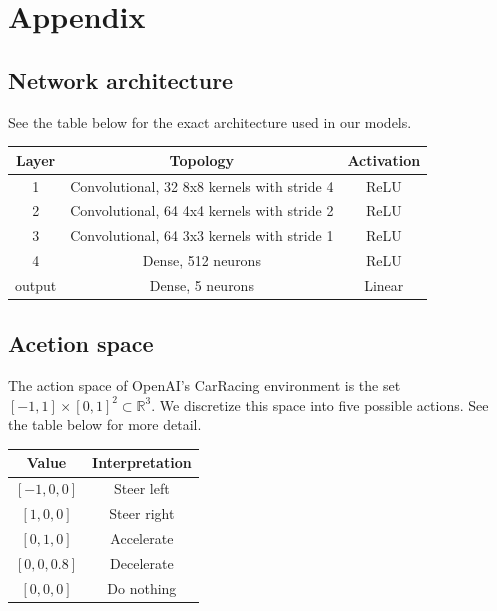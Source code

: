 \documentclass{article}
\begin{document}
\section{Appendix}
\subsection{Network architecture}
See the table below for the exact architecture used in our models. 
\begin{table}[h!]
  \begin{center}
    \begin{tabular}{c|c|c}
      \textbf{Layer} & \textbf{Topology} & \textbf{Activation}\\
      \hline
      1 & Convolutional, 32 8x8 kernels with stride 4 & ReLU \\
      2 & Convolutional, 64 4x4 kernels with stride 2 & ReLU \\
      3 & Convolutional, 64 3x3 kernels with stride 1 & ReLU \\
      4 & Dense, 512 neurons & ReLU \\
      output & Dense, 5 neurons & Linear \\
    \end{tabular}
    \vspace{0.1cm}
    \label{tab:network_architecture}
  \end{center}
\end{table}

\subsection{Acetion space}
The action space of OpenAI's CarRacing environment is the set $[-1,1] \times [0,1]^2 \subset \mathbb{R}^3$. We discretize this space into five possible actions. See the table below for more detail. 
\begin{table}[h!]
  \begin{center}
    \begin{tabular}{c|c}
      \textbf{Value} & \textbf{Interpretation} \\
      \hline
      $[-1,0,0]$ & Steer left \\
      $[1,0,0]$ & Steer right \\
      $[0,1,0]$ & Accelerate \\
      $[0,0,0.8]$ & Decelerate \\
      $[0,0,0]$ & Do nothing \\
    \end{tabular}
    \vspace{0.1cm}
    \label{tab:actions}
  \end{center}
\end{table}
\end{document}
